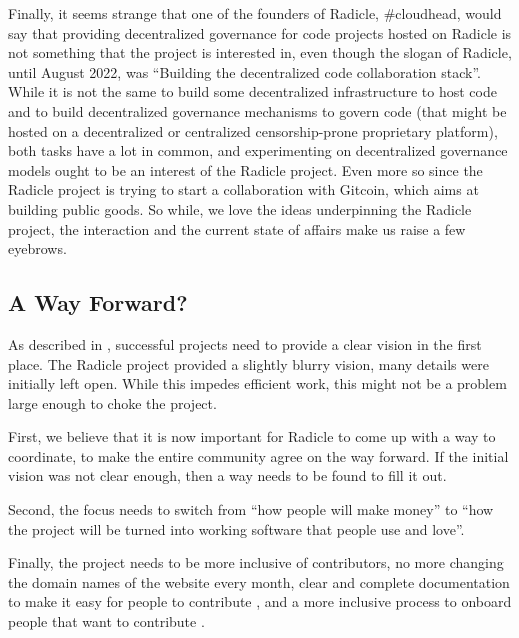Finally, it seems strange that one of the founders of Radicle, \#cloudhead, would say that providing decentralized governance for code projects hosted on Radicle is not something that the project is interested in, even though the slogan of Radicle, until August 2022, was \enquote{Building the decentralized code collaboration stack}.
While it is not the same to build some decentralized infrastructure to host code and to build decentralized governance mechanisms to govern code (that might be hosted on a decentralized or centralized censorship-prone proprietary platform), both tasks have a lot in common, and experimenting on decentralized governance models ought to be an interest of the Radicle project.
Even more so since the Radicle project is trying to start a collaboration with Gitcoin, which aims at building public goods.
So while, we love the ideas underpinning the Radicle project, the interaction and the current state of affairs make us raise a few eyebrows.

\subsection{A Way Forward?}

As described in \cite{raymond_cathedral_2001}, successful projects need to provide a clear vision in the first place.
The Radicle project provided a slightly blurry vision, many details were initially left open.
While this impedes efficient work, this might not be a problem large enough to choke the project.

First, we believe that it is now important for Radicle to come up with a way to coordinate, to make the entire community agree on the way forward.
If the initial vision was not clear enough, then a way needs to be found to fill it out.

Second, the focus needs to switch from \enquote{how people will make money} to \enquote{how the project will be turned into working software that people use and love}.

Finally, the project needs to be more inclusive of contributors, no more changing the domain names of the website every month, clear and complete documentation to make it easy for people to contribute%
, and a more inclusive process to onboard people that want to contribute%
.

